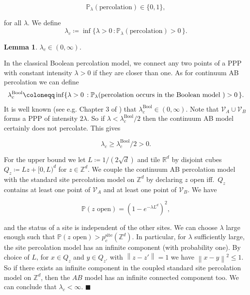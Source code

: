 \documentclass[11pt]{article}%
\newenvironment{proof}{\vspace{1ex}\noindent{\bf Proof.}}{\hspace*{\fill}$\blacksquare$\vspace{1ex}}
\newtheorem{lemma}[lemma]{Lemma}
\newcommand{\Vcal}[0]{\ensuremath{{\mathcal V}}}
\newcommand{\Zed}[0]{\ensuremath{ \mathbb Z}}
\newcommand{\norm}[1]{\ensuremath{\left\|#1\right\|}}
\newcommand{\RR}{\mathbb{R}}
\newcommand{\ZZ}{\mathbb{Z}}
\newcommand{\Pro}{\mathbb{P}}
\begin{document}
	$$\Pro_\lambda(\text{percolation})\in\{0,1\},$$ 
	
	\noindent
	for all $\lambda$. We define 
\begin{equation*}
	\lambda_c\coloneqq\inf\{\lambda>0\,:\Pro_\lambda(\text{percolation})>0\,\}.
\end{equation*}

\begin{lemma}\label{nontriv}
	$\lambda_c\in (0,\infty) $.
\end{lemma}
\begin{proof}
	In the classical Boolean percolation model, we connect any two points of a PPP 
	with constant intensity $ \lambda>0 $ if they are closer than one. As for continuum AB percolation we can define
	\begin{equation*}
	 \lambda_c^{\text{Bool}}\coloneqq\inf\{\lambda>0\,:\Pro_{\lambda}(\text{percolation occurs in the Boolean model\
	 })>0\,\}.
	\end{equation*} 
	It is well known (see e.g. Chapter 3 of \cite{meester1996continuum}) that $ \lambda_c^{\text{Bool}} \in (0,\infty)$.
	Note that $\Vcal_A \cup \Vcal_B$ forms a PPP of intensity $2\lambda$. So if $\lambda < \lambda_c^{\text{Bool}}/2$ then 
	the continuum AB model certainly does not percolate.
	This gives  
	
	$$\lambda_c \geq \lambda_c^{\text{Bool}}/2 > 0. $$
	
	For the upper bound we let $L\coloneqq 1/(2\sqrt{d})$ and tile $\RR^d$ by disjoint 
	cubes $Q_z\coloneqq Lz+[0,L)^d$ for $z\in \ZZ^d$. 
	We couple the continuum AB percolation model with the standard site percolation model on $\ZZ^d$ by declaring $z$ 
	open iff.~$Q_z$ contains at least one 
	point of $\mathcal{V}_A$ and at least one point of $\mathcal{V}_B$. We have 
	
	$$\Pro(z\text{ open})=(1-e^{-\lambda L^d})^2,$$ 
	
	\noindent 
	and 
	the status of a site is independent of the other sites. 
	We can choose $\lambda$ large enough such that $\Pro(z\text{ open})>p_c^\text{site}(\ZZ^d)$. 
	In particular, for $\lambda$ sufficiently large, the site percolation model has an infinite component 
	(with probability one).
	By choice of $L$, for $x\in Q_z$ and $y\in Q_{z'}$ with $\norm{z-z'}=1$ we have $\norm{x-y}^2\leq 1$.
        So if there exists an infinite component in the coupled standard site percolation model on $\Zed^d$, then the 
        $AB$ model has an infinite connected component too. We can conclude that $\lambda_c<\infty$.
\end{proof}
\end{document}
